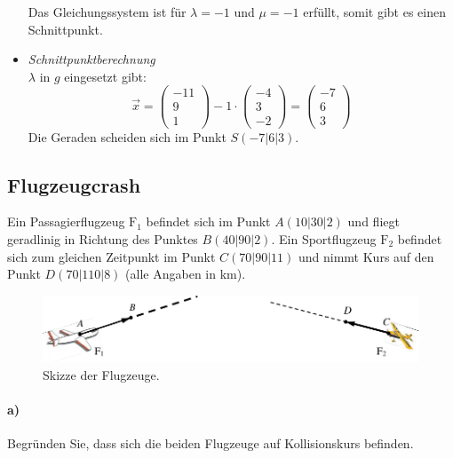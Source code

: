 \documentclass{ajc}
\numberwithin{equation}{subsection}
\begin{document}
\begin{itemize}
		Das Gleichungssystem ist für $\lambda = -1$ und $\mu = -1$ erfüllt, somit gibt es einen Schnittpunkt. \\
		\item \textit{Schnittpunktberechnung} \\
		$\lambda$ in $g$ eingesetzt gibt: 
		\begin{equation}
			\overrightarrow{x}=\left(\begin{array}{r} -11 \\ 9 \\ 1\end{array}\right) -1 \cdot \left(\begin{array}{r} -4 \\ 3 \\ -2\end{array}\right) = \left(\begin{array}{r} -7 \\ 6 \\ 3\end{array}\right)
		\end{equation}
		Die Geraden scheiden sich im Punkt $S(-7|6|3)$.
	\end{itemize}
	
	\subsection{Flugzeugcrash}
	Ein Passagierflugzeug $\text{F}_1$ befindet sich im Punkt  $A(10|30|2)$ und fliegt geradlinig in Richtung des Punktes $B(40|90|2)$. Ein Sportflugzeug $\text{F}_2$ befindet sich zum gleichen Zeitpunkt im Punkt $C(70|90|11)$ und nimmt Kurs auf den Punkt $D(70|110|8)$ (alle Angaben in km).
	
	\begin{figure}[ht]
		\centering
		\includegraphics[width=\textwidth]{ma_003_flugzeuge.pdf}
		\caption{Skizze der Flugzeuge.}
		\label{fig:003_flugzeuge}
	\end{figure}
	
	\paragraph{a)} Begründen Sie, dass sich die beiden Flugzeuge auf Kollisionskurs befinden.
	
\end{document}
